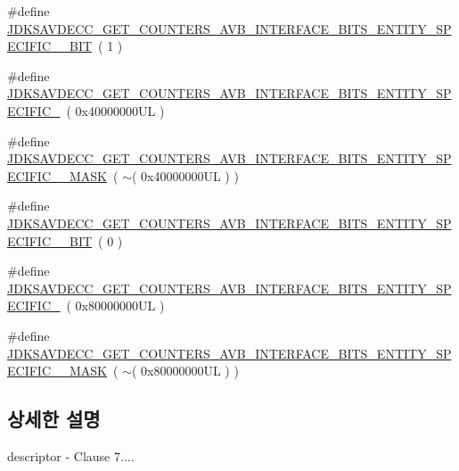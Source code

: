 \begin{DoxyCompactItemize}
\item 
\#define \hyperlink{group__get__counters__avb__interface__bits_gac1c8e0455916727f705247661f14ae64}{J\+D\+K\+S\+A\+V\+D\+E\+C\+C\+\_\+\+G\+E\+T\+\_\+\+C\+O\+U\+N\+T\+E\+R\+S\+\_\+\+A\+V\+B\+\_\+\+I\+N\+T\+E\+R\+F\+A\+C\+E\+\_\+\+B\+I\+T\+S\+\_\+\+E\+N\+T\+I\+T\+Y\+\_\+\+S\+P\+E\+C\+I\+F\+I\+C\+\_\+\_\+\+B\+IT}~( 1 )
\item 
\#define \hyperlink{group__get__counters__avb__interface__bits_ga16ab2fb8ad2a713b4688dafe5ecc3d12}{J\+D\+K\+S\+A\+V\+D\+E\+C\+C\+\_\+\+G\+E\+T\+\_\+\+C\+O\+U\+N\+T\+E\+R\+S\+\_\+\+A\+V\+B\+\_\+\+I\+N\+T\+E\+R\+F\+A\+C\+E\+\_\+\+B\+I\+T\+S\+\_\+\+E\+N\+T\+I\+T\+Y\+\_\+\+S\+P\+E\+C\+I\+F\+I\+C\+\_}~( 0x40000000\+U\+L )
\item 
\#define \hyperlink{group__get__counters__avb__interface__bits_gad97c7f3f1a14a8eb183ec96e43243fad}{J\+D\+K\+S\+A\+V\+D\+E\+C\+C\+\_\+\+G\+E\+T\+\_\+\+C\+O\+U\+N\+T\+E\+R\+S\+\_\+\+A\+V\+B\+\_\+\+I\+N\+T\+E\+R\+F\+A\+C\+E\+\_\+\+B\+I\+T\+S\+\_\+\+E\+N\+T\+I\+T\+Y\+\_\+\+S\+P\+E\+C\+I\+F\+I\+C\+\_\+\_\+\+M\+A\+SK}~( $\sim$( 0x40000000\+U\+L ) )
\item 
\#define \hyperlink{group__get__counters__avb__interface__bits_gaaefd0840ae3ff3f164a1519afdf46d20}{J\+D\+K\+S\+A\+V\+D\+E\+C\+C\+\_\+\+G\+E\+T\+\_\+\+C\+O\+U\+N\+T\+E\+R\+S\+\_\+\+A\+V\+B\+\_\+\+I\+N\+T\+E\+R\+F\+A\+C\+E\+\_\+\+B\+I\+T\+S\+\_\+\+E\+N\+T\+I\+T\+Y\+\_\+\+S\+P\+E\+C\+I\+F\+I\+C\+\_\+\_\+\+B\+IT}~( 0 )
\item 
\#define \hyperlink{group__get__counters__avb__interface__bits_gaed3c2f49c7271f5ce2c99d1f6ca5ada2}{J\+D\+K\+S\+A\+V\+D\+E\+C\+C\+\_\+\+G\+E\+T\+\_\+\+C\+O\+U\+N\+T\+E\+R\+S\+\_\+\+A\+V\+B\+\_\+\+I\+N\+T\+E\+R\+F\+A\+C\+E\+\_\+\+B\+I\+T\+S\+\_\+\+E\+N\+T\+I\+T\+Y\+\_\+\+S\+P\+E\+C\+I\+F\+I\+C\+\_}~( 0x80000000\+U\+L )
\item 
\#define \hyperlink{group__get__counters__avb__interface__bits_gaa0ff4a2af87a4b65737e845fd721018d}{J\+D\+K\+S\+A\+V\+D\+E\+C\+C\+\_\+\+G\+E\+T\+\_\+\+C\+O\+U\+N\+T\+E\+R\+S\+\_\+\+A\+V\+B\+\_\+\+I\+N\+T\+E\+R\+F\+A\+C\+E\+\_\+\+B\+I\+T\+S\+\_\+\+E\+N\+T\+I\+T\+Y\+\_\+\+S\+P\+E\+C\+I\+F\+I\+C\+\_\+\_\+\+M\+A\+SK}~( $\sim$( 0x80000000\+U\+L ) )
\end{DoxyCompactItemize}


\subsection{상세한 설명}
descriptor -\/ Clause 7.... 


